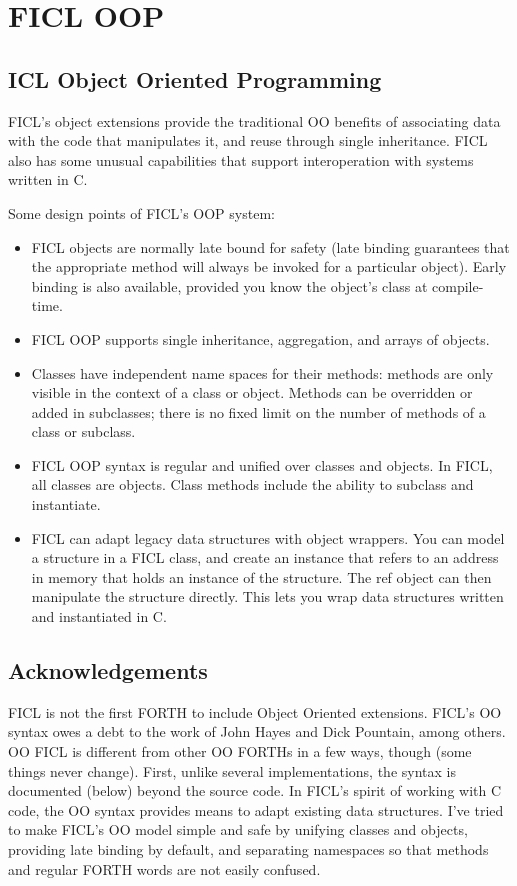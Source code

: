 \chapter{FICL OOP}
\section{ICL Object Oriented Programming}
FICL's object extensions provide the traditional OO benefits of
associating data with the code that manipulates it, and reuse through
single inheritance. FICL also has some unusual capabilities that support
interoperation with systems written in C.

Some design points of FICL's OOP system:
\begin{itemize}[noitemsep]
	\item FICL objects are normally late bound for safety (late
	binding guarantees that the appropriate method will always be
	invoked for a particular object). Early binding is also
	available, provided you know the object's class at compile-time.

	\item FICL OOP supports single inheritance, aggregation, and
	arrays of objects.

	\item Classes have independent name spaces for their methods:
	methods are only visible in the context of a class or object.
	Methods can be overridden or added in subclasses; there is no
	fixed limit on the number of methods of a class or subclass.

	\item FICL OOP syntax is regular and unified over classes and
	objects. In FICL, all classes are objects. Class methods include
	the ability to subclass and instantiate.

	\item FICL can adapt legacy data structures with object
	wrappers. You can model a structure in a FICL class, and create
	an instance that refers to an address in memory that holds an
	instance of the structure. The ref object can then manipulate
	the structure directly. This lets you wrap data structures
	written and instantiated in C.
\end{itemize}


\section{Acknowledgements}
FICL is not the first FORTH to include Object Oriented extensions.
FICL's OO syntax owes a debt to the work of John Hayes and Dick
Pountain, among others. OO FICL is different from other OO FORTHs in a
few ways, though (some things never change). First, unlike several
implementations, the syntax is documented (below) beyond the source
code. In FICL's spirit of working with C code, the OO syntax provides
means to adapt existing data structures. I've tried to make FICL's OO
model simple and safe by unifying classes and objects, providing late
binding by default, and separating namespaces so that methods and
regular FORTH words are not easily confused.



